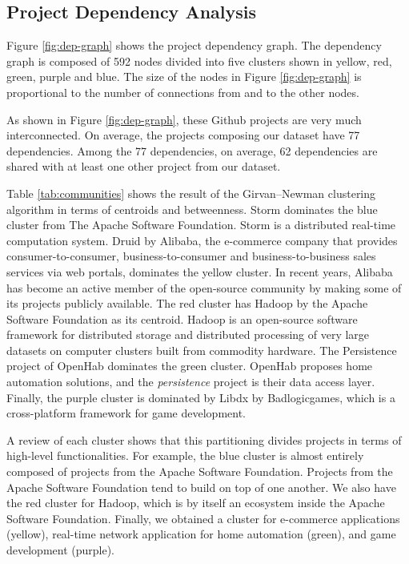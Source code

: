 \documentclass[12pt]{report}
\begin{document}
\subsection{Project Dependency Analysis}\label{sec:dependencies}

Figure \ref{fig:dep-graph} shows the project dependency graph. The
dependency graph is composed of 592 nodes divided into five clusters
shown in yellow, red, green, purple and blue. The size of the nodes in
Figure \ref{fig:dep-graph} is proportional to the number of connections
from and to the other nodes.



As shown in Figure \ref{fig:dep-graph}, these Github projects are very
much interconnected. On average, the projects composing our dataset have
77 dependencies. Among the 77 dependencies, on average, 62 dependencies
are shared with at least one other project from our dataset.

Table \ref{tab:communities} shows the result of the Girvan--Newman
clustering algorithm in terms of centroids and betweenness. Storm
dominates the blue cluster from The Apache Software Foundation. Storm is
a distributed real-time computation system. Druid by Alibaba, the
e-commerce company that provides consumer-to-consumer,
business-to-consumer and business-to-business sales services via web
portals, dominates the yellow cluster. In recent years, Alibaba has
become an active member of the open-source community by making some of
its projects publicly available. The red cluster has Hadoop by the
Apache Software Foundation as its centroid. Hadoop is an open-source
software framework for distributed storage and distributed processing of
very large datasets on computer clusters built from commodity hardware.
The Persistence project of OpenHab dominates the green cluster. OpenHab
proposes home automation solutions, and the \emph{persistence} project
is their data access layer. Finally, the purple cluster is dominated by
Libdx by Badlogicgames, which is a cross-platform framework for game
development.

A review of each cluster shows that this partitioning divides projects
in terms of high-level functionalities. For example, the blue cluster is
almost entirely composed of projects from the Apache Software
Foundation. Projects from the Apache Software Foundation tend to build
on top of one another. We also have the red cluster for Hadoop, which is
by itself an ecosystem inside the Apache Software Foundation. Finally,
we obtained a cluster for e-commerce applications (yellow), real-time
network application for home automation (green), and game development
(purple).
\end{document}
